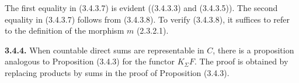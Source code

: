 \clearpage
{}%
\begingroup
\small

The first equality in (3.4.3.7) is evident ((3.4.3.3) and (3.4.3.5)).
The second equality in (3.4.3.7) follows from (3.4.3.8). To verify
(3.4.3.8), it suffices to refer to the definition of the morphism $m$
(2.3.2.1).

\noindent\textbf{3.4.4.}\quad
When countable direct sums are representable in $C$, there is a proposition
analogous to Proposition (3.4.3) for the functor $K_{\Sigma}F$. The proof is
obtained by replacing products by sums in the proof of Proposition (3.4.3).
\endgroup

